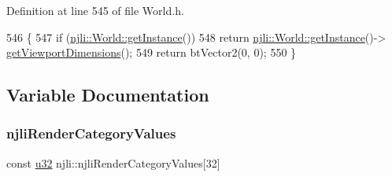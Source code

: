 Definition at line 545 of file World.\+h.


\begin{DoxyCode}
546   \{
547     \textcolor{keywordflow}{if} (\mbox{\hyperlink{classnjli_1_1_world_a17a72893105bc732fdf5751a2a23b6d4}{njli::World::getInstance}}())
548       \textcolor{keywordflow}{return} \mbox{\hyperlink{classnjli_1_1_world_a17a72893105bc732fdf5751a2a23b6d4}{njli::World::getInstance}}()->
      \mbox{\hyperlink{classnjli_1_1_world_a0d888d6664fed006bde6e9fd806bc41c}{getViewportDimensions}}();
549     \textcolor{keywordflow}{return} btVector2(0, 0);
550   \}
\end{DoxyCode}


\subsection{Variable Documentation}
\mbox{\label{namespacenjli_a65d693b7c5879aee9e181234f22b7b2a}} 
\subsubsection{\texorpdfstring{njli\+Render\+Category\+Values}{njliRenderCategoryValues}}
{\footnotesize\ttfamily const \mbox{\hyperlink{_util_8h_a10e94b422ef0c20dcdec20d31a1f5049}{u32}} njli\+::njli\+Render\+Category\+Values\mbox{[}32\mbox{]}}

